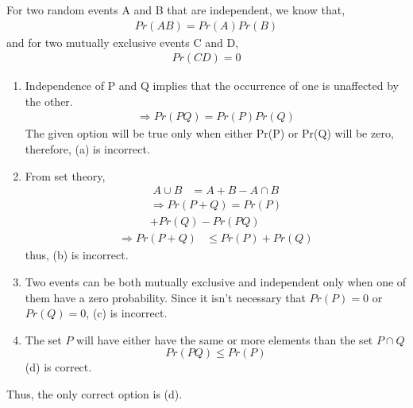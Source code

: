 For two random events A and B that are independent, we know that, 
\begin{align}
Pr(AB) = Pr(A)Pr(B)
\end{align}
and for two mutually exclusive events C and D, 
\begin{align}
    Pr(CD) = 0
\end{align}

\begin{enumerate}[label = (\alph*)]
    \item Independence of P and Q implies that the occurrence of one is unaffected by the other. 
    \begin{align}
       \Rightarrow Pr(PQ) = Pr(P)Pr(Q)
    \end{align}
    The given option will be true only when either Pr(P) or Pr(Q) will be zero, therefore, (a) is incorrect.\\
    \item From set theory,
    \begin{align}
    A\cup B &= A + B - A\cap B
    \end{align}
    \begin{multline}
    \Rightarrow Pr(P+Q) = Pr(P) \\+ Pr(Q)- Pr(PQ)
    \label{ee2005:eq:5}
    \end{multline}
    \begin{align}
    \Rightarrow Pr(P+Q) &\leq Pr(P) + Pr(Q)
    \end{align}
    thus, (b) is incorrect.\\
    \item Two events can be both mutually exclusive and independent only when one of them have a zero probability. Since it isn't necessary that $Pr(P)=0$ or $Pr(Q)=0$, (c) is incorrect.\\
    \item The set $P$ will have either have the same or more elements than the set $P\cap Q$
    \begin{equation}
        Pr(PQ) \leq Pr(P)
    \end{equation}
    (d) is correct.\\
\end{enumerate}
Thus, the only correct option is (d).